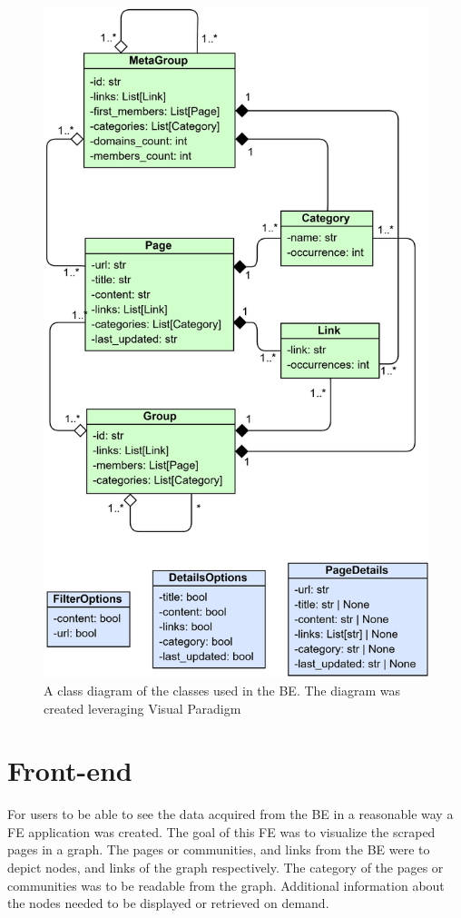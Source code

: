 \begin{figure}[ht!]
  \centering
  \includegraphics[height=0.9\textheight]{Images/BEmodelsDiagram.png}
  \caption{A class diagram of the classes used in the BE. The diagram was created leveraging Visual Paradigm \cite{visualParadigm}}
  \label{BEmodelsDiagram}
\end{figure} 
 


\section{Front-end}
For users to be able to see the data acquired from the BE in a reasonable way a FE application was created. The goal of this FE was to visualize the scraped pages in a graph. The pages or communities, and links from the BE were to depict nodes, and links of the graph respectively. The category of the pages or communities was to be readable from the graph. Additional information about the nodes needed to be displayed or retrieved on demand.

